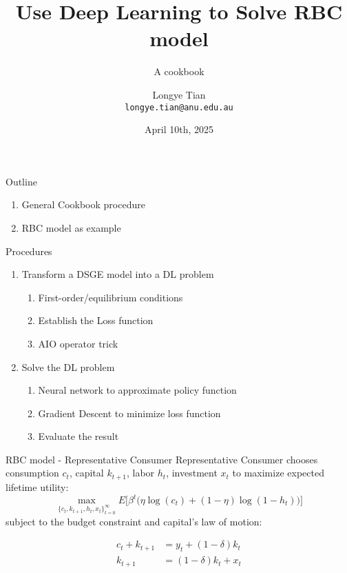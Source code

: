 \documentclass[aspectratio=169]{beamer} %
\title[DL]{Use Deep Learning to Solve RBC model}
\subtitle{A cookbook}
\author[Longye]{Longye Tian \\ \texttt{longye.tian@anu.edu.au}}
\institute[ANU]{Australian National University\\ School of Economics}
\date{April 10th, 2025}
\begin{document}
\begin{frame}
  \titlepage
\end{frame}

\begin{frame}{Outline}
  \begin{enumerate}
      \item General Cookbook procedure
      \item RBC model as example
  \end{enumerate}
\end{frame}

\begin{frame}{Procedures}
\begin{enumerate}
    \item Transform a DSGE model into a DL problem
    \begin{enumerate}
        \item First-order/equilibrium conditions
        \item Establish the Loss function
        \item AIO operator trick
    \end{enumerate}
    \item Solve the DL problem
    \begin{enumerate}
        \item Neural network to approximate policy function
        \item Gradient Descent to minimize loss function
        \item Evaluate the result
    \end{enumerate}
\end{enumerate}
    
\end{frame}


\begin{frame}{RBC model - Representative Consumer}
Representative Consumer chooses consumption $c_t$, capital $k_{t+1}$, labor $h_t$, investment $x_t$ to maximize expected lifetime utility:
$$ \max_{\{c_t, k_{t+1}, h_t,x_t\}_{t=0}^{\infty}} E \big[ \beta^t \Big(\eta \log(c_t) + (1-\eta)\log(1 - h_t) \Big) \Big]$$
subject to the budget constraint and capital's law of motion:

\begin{align*}
    c_t + k_{t+1} &= y_t + (1 - \delta)k_{t}\tag{1}\\
    k_{t+1} &= (1-\delta)k_t + x_t\tag{2}
\end{align*}
   
    
\end{frame}
\end{document}
